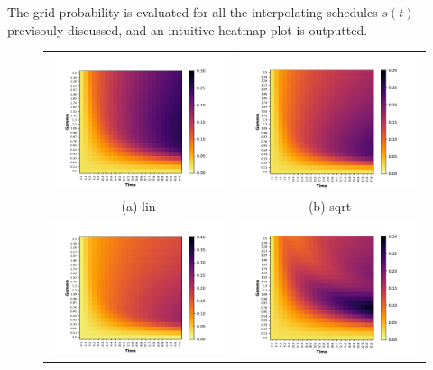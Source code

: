         The grid-probability is evaluated for all the interpolating schedules $s(t)$ previsouly discussed, and an intuitive heatmap plot is outputted.
        \begin{figure}[ht]
        \centering
        \begin{tabular}{cc}
          \includegraphics[width=75mm]{./figures/time_dependent_heatmap/47_heatmap_time_dependent_lin.pdf} &   \includegraphics[width=75mm]{./figures/time_dependent_heatmap/47_heatmap_time_dependent_sqrt.pdf} \\
        (a) lin & (b) sqrt\\[6pt]
        \includegraphics[width=75mm]{./figures/time_dependent_heatmap/47_heatmap_time_dependent_cbrt.pdf} &   \includegraphics[width=75mm]{./figures/time_dependent_heatmap/47_heatmap_time_dependent_cerf.pdf} \\

\end{tabular}
\end{figure}

